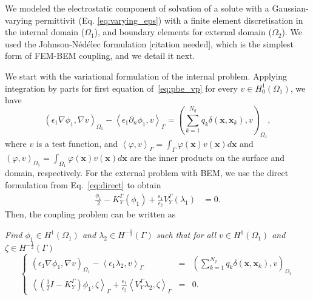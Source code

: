    We modeled the electrostatic component of solvation of a solute with a Gaussian-varying permittivit (Eq. \eqref{eq:varying_eps}) with a finite element discretisation in the internal domain ($\Omega_1$), and boundary elements for external domain ($\Omega_2$). We used the Johnson-N\'ed\'elec formulation [citation needed], which is the simplest form of FEM-BEM coupling, and we detail it next.

   We start with the variational formulation of the internal problem. Applying integration by parts for first equation of~\eqref{eq:pbe_vp} for every $v \in H_0^1(\Omega_1)$, we have
% 
\begin{equation}
\label{eq:fem}
 \left( \epsilon_1 \nabla \phi_1, \nabla v \right)_{\Omega_1}  -  \left<  \epsilon_1\partial_n \phi_1, v \right>_\Gamma =  \left( \sum_{k=1}^{N_q} q_k\delta(\mathbf{x},\mathbf{x}_k),  v\right)_{\Omega_1},
\end{equation}
%
where $v$ is a test function, and $\left<\varphi,v\right>_\Gamma = \int_\Gamma \varphi(\mathbf{x})v(\mathbf{x})d\mathbf{x}$ and $\left(\varphi,v\right)_{\Omega_1} = \int_{\Omega_1} \varphi(\mathbf{x})v(\mathbf{x})d\mathbf{x}$ are the inner products on the surface and domain, respectively.
For the external problem with BEM, we use the direct formulation from Eq.~\eqref{eq:direct} to obtain
\begin{align*}
\tfrac{\phi_1}{2} - K_{Y}^{\Gamma}(\phi_1) + \tfrac{\epsilon_1}{\epsilon_2}V_{Y}^{\Gamma}  \left(\lambda_1 \right) & = 0.
\end{align*}
%
Then, the coupling problem can be written as
%
\begin{center}
  \textit{Find $ \phi_1 \in H^1(\Omega_1)$ and $\lambda_2 \in H^{-\frac{1}{2}}(\Gamma)$ such that for all $v \in H^1(\Omega_1)$ and $\zeta \in H^{-\frac{1}{2}}(\Gamma)$}
\begin{equation} 
\label{eq:standard_fem_bem}
 \left\{
 \begin{array}{rcl}
 \left(  \epsilon_1 \nabla \phi_1, \nabla v \right)_{\Omega_1}  - \left< \epsilon_1 \lambda_2, v \right>_\Gamma &=&   \left(  \sum_{k=1}^{N_q} q_k\delta(\mathbf{x},\mathbf{x}_k),  v \right)_{\Omega_1} \\[3mm] 
  \left< \left(\tfrac{1}{2} I - K_{Y}^{\Gamma}\right) \phi_1, \zeta \right>_\Gamma + \tfrac{\epsilon_1}{\epsilon_2} \left< V_{Y}^{\Gamma} \lambda_2, \zeta \right>_\Gamma &=&0.
  \end{array}
  \right.
\end{equation}
\end{center}


